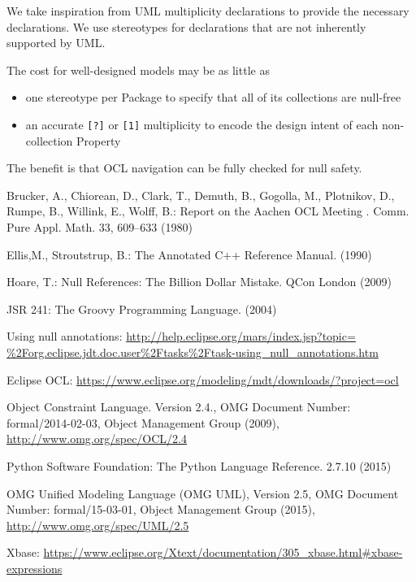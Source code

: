 \documentclass{llncs}
\begin{document}
We take inspiration from UML multiplicity declarations to provide the necessary declarations. We use stereotypes for declarations that are not inherently supported by UML.

The cost for well-designed models may be as little as 
\begin{itemize}
\item one stereotype per Package to specify that all of its collections are null-free
\item an accurate \verb$[?]$ or \verb$[1]$ multiplicity to encode the design intent of each non-collection Property
\end{itemize}

The benefit is that OCL navigation can be fully checked for null safety.

%
%
\begin{thebibliography}{}
%
Brucker, A., Chiorean, D., Clark, T., Demuth, B., Gogolla, M., Plotnikov, D., Rumpe, B., Willink, E., Wolff, B.:
Report on the Aachen OCL Meeting .
Comm. Pure Appl. Math. 33, 609--633 (1980)

Ellis,M., Stroutstrup, B.:
The Annotated C++ Reference Manual.
(1990)

Hoare, T.:
Null References: The Billion Dollar Mistake.
QCon London (2009)

JSR 241:
The Groovy Programming Language.
(2004)

Using null annotations:
\url{http://help.eclipse.org/mars/index.jsp?topic=
\%2Forg.eclipse.jdt.doc.user\%2Ftasks\%2Ftask-using\_null\_annotations.htm}

Eclipse OCL:
\url{https://www.eclipse.org/modeling/mdt/downloads/?project=ocl}

 Object Constraint Language. Version 2.4., OMG Document Number: formal/2014-02-03, Object Management Group (2009),  \url{http://www.omg.org/spec/OCL/2.4}

Python Software Foundation:
The Python Language Reference.
2.7.10 (2015)

 OMG Unified Modeling Language (OMG UML), Version 2.5, {OMG Document Number}: formal/15-03-01, Object Management Group (2015), \url{http://www.omg.org/spec/UML/2.5}

Xbase:
\url{https://www.eclipse.org/Xtext/documentation/305\_xbase.html\#xbase-expressions}

\end{thebibliography}
\end{document}
